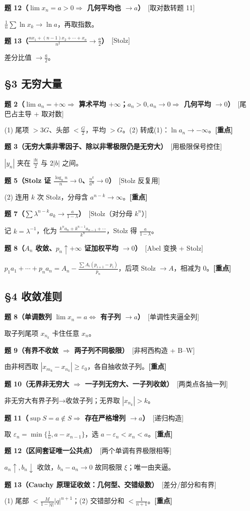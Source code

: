 \documentclass[11pt,a4paper,UTF8]{ctexart}
\newcommand{\eps}{\varepsilon}
\newcommand{\p}[2]{\par\smallskip\noindent\textbf{#1}\ \textcolor{blue!55!black}{[#2]}\par\nopagebreak}
\begin{document}
\p{题 12（$\lim x_n=a>0\Rightarrow$ 几何平均也 $\to a$）}{取对数转题 11}
$\frac1n\sum\ln x_k\to\ln a$，再取指数。

\p{题 13（$\frac{nx_1+(n-1)x_2+\cdots+x_n}{n^2}\to\frac a2$）}{Stolz}
差分比值 $\to\frac a2$。

\subsection*{§3 无穷大量}
\p{题 2（$\lim a_n=+\infty\Rightarrow$ 算术平均 $+\infty$；$a_n>0,a_n\to0\Rightarrow$ 几何平均 $\to0$）}{尾巴占主导 + 取对数}
(1) 尾项 $>3G$、头部 $<\frac G2$，平均 $>G$。(2) 转成(1)：$\ln a_n\to-\infty$。\textbf{[重点]}

\p{题 3（无穷大乘非零因子、除以非零极限仍是无穷大）}{用极限保号控住}
$|y_n|$ 夹在 $\frac{|b|}2$ 与 $2|b|$ 之间。

\p{题 5（Stolz 证 $\frac{\log_a n}{n}\to0$、$\frac{n^k}{a^n}\to0$）}{Stolz 反复用}
(2) 连用 $k$ 次 Stolz，分母含 $a^{n-k}\to\infty$。\textbf{[重点]}

\p{题 7（$\sum\lambda^{n-k}a_k\to\frac a{1-\lambda}$）}{Stolz（对分母 $k^n$）}
记 $k=\lambda^{-1}$，化为 $\frac{k^na_n+k^{n-1}a_{n-1}+\cdots}{k^n}$，Stolz 得 $\frac a{1-\lambda}$。

\p{题 8（$A_n$ 收敛、$p_n\uparrow+\infty$ 证加权平均 $\to0$）}{Abel 变换 + Stolz}
$p_1a_1+\cdots+p_na_n=A_n-\frac{\sum A_{i}(p_{i+1}-p_i)}{p_n}$，后项 Stolz $\to A$，相减为 0。\textbf{[重点]}

\subsection*{§4 收敛准则}
\p{题 8（单调数列 $\lim x_n=a\iff$ 有子列 $\to a$）}{单调性夹逼全列}
取子列尾项 $x_{n_k}$ 卡住任意 $x_n$。

\p{题 9（有界不收敛 $\Rightarrow$ 两子列不同极限）}{非柯西构造 + B–W}
由非柯西取 $|x_{m_k}-x_{n_k}|\ge\eps_0$，各自抽收敛子列。\textbf{[重点]}

\p{题 10（无界非无穷大 $\Rightarrow$ 一子列无穷大、一子列收敛）}{两类点各抽一列}
非无穷大有界子列→收敛子列；无界取 $|x_{n_k}|>k$。

\p{题 11（$\sup S=a\notin S\Rightarrow$ 存在严格增列 $\to a$）}{递归构造}
取 $\eps_n=\min\{\frac1n,a-x_{n-1}\}$，选 $a-\eps_n<x_n<a$。\textbf{[重点]}

\p{题 12（区间套证唯一公共点）}{两个单调有界极限相等}
$a_n\uparrow,b_n\downarrow$ 收敛，$b_n-a_n\to0$ 故同极限 $\xi$；唯一由夹逼。

\p{题 13（Cauchy 原理证收敛：几何型、交错级数）}{差分/部分和有界}
(1) 尾部 $<\frac{M}{1-|q|}|q|^{n+1}$；(2) 交错部分和 $<\frac1{n+1}$。\textbf{[重点]}
\end{document}
